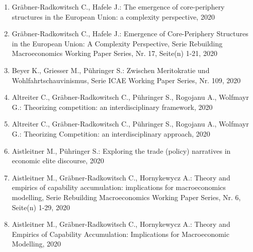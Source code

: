 \begin{enumerate}
	 \item Gräbner-Radkowitsch C., Hafele J.: The emergence of core-periphery structures in the European Union: a complexity perspective, 2020
	 \item Gräbner-Radkowitsch C., Hafele J.: Emergence of Core-Periphery Structures in the European Union: A Complexity Perspective, Serie Rebuilding Macroeconomics Working Paper Series, Nr. 17, Seite(n) 1-21, 2020
	 \item Beyer K., Griesser M., Pühringer S.: Zwischen Meritokratie und Wohlfahrtschauvinismus, Serie ICAE Working Paper Series, Nr. 109, 2020
	 \item Altreiter C., Gräbner-Radkowitsch C., Pühringer S., Rogojanu A., Wolfmayr G.: Theorizing competition: an interdisciplinary framework, 2020
	 \item Altreiter C., Gräbner-Radkowitsch C., Pühringer S., Rogojanu A., Wolfmayr G.: Theorizing Competition: an interdisciplinary approach, 2020
	 \item Aistleitner M., Pühringer S.: Exploring the trade (policy) narratives in economic elite discourse, 2020
	 \item Aistleitner M., Gräbner-Radkowitsch C., Hornykewycz A.: Theory and empirics of capability accumulation: implications for macroeconomics modelling, Serie Rebuilding Macroeconomics Working Paper Series, Nr. 6, Seite(n) 1-29, 2020
	 \item Aistleitner M., Gräbner-Radkowitsch C., Hornykewycz A.: Theory and Empirics of Capability Accumulation: Implications for Macroeconomic Modelling, 2020
\end{enumerate}
